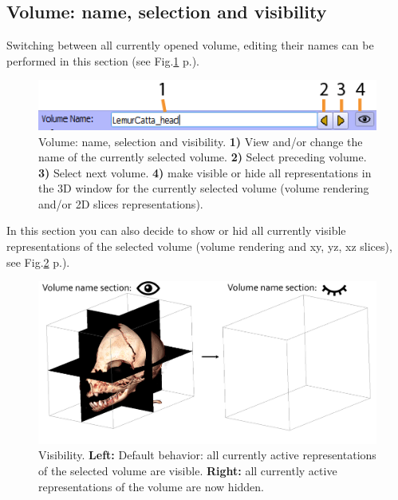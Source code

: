 \subsection{Volume: name, selection and visibility}
Switching between all currently opened volume, editing their names can be performed in this section (see Fig.\ref{volume_name} p.\pageref{volume_name}).
\begin{figure}
  \centering
  \includegraphics[scale=1]{images/14/volume_name2.png}
\caption{Volume: name, selection and visibility. \textbf{1)} View and/or change the name of the currently selected volume.  \textbf{2)} Select preceding volume.  \textbf{3)} Select next volume. \textbf{4)} make visible or hide all representations in the 3D window for the currently selected volume (volume rendering and/or 2D slices representations). }	
\label{volume_name}
 \end{figure}

In this section you can also decide to show or hid all currently visible representations of the selected volume (volume rendering and xy, yz, xz slices), see Fig.\ref{volume_name_visibility} p.\pageref{volume_name_visiblity}).
\begin{figure}
  \centering
  \includegraphics[scale=0.3]{images/14/volume_name/volume_name_visibility.png}
\caption{Visibility. \textbf{Left:} Default behavior: all currently active representations of the selected volume are visible.   \textbf{Right:} all currently active representations of the volume are now hidden.}	
\label{volume_name_visibility}
 \end{figure}


